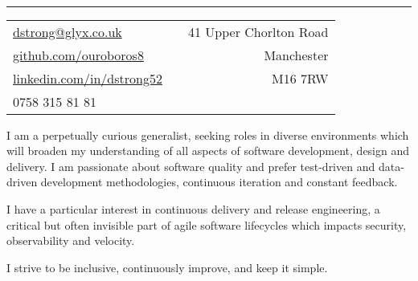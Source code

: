 \documentclass[a4paper,10pt]{article} %
\begin{document}
\pagestyle{empty} %


\\ %
\hrule
\footnotesize
{\begin{tabularx}{\textwidth}{lXr}
\href{mailto:dstrong@glyx.co.uk}{dstrong@glyx.co.uk}                    & & {41 Upper Chorlton Road}\\
\href{https://github.com/ouroboros8}{github.com/ouroboros8}             & & {Manchester}\\
\href{https://www.linkedin.com/in/dstrong52}{linkedin.com/in/dstrong52} & & {M16 7RW} \\
{0758 315 81 81}                                                        & &
\end{tabularx}}

\begin{flushleft}
I am a perpetually curious generalist, seeking roles in diverse environments
which will broaden my understanding of all aspects of software development,
design and delivery. I am passionate about software quality and prefer
test-driven and data-driven development methodologies, continuous iteration and
constant feedback.

I have a particular interest in continuous delivery and release engineering, a
critical but often invisible part of agile software lifecycles which impacts
security, observability and velocity.

I strive to be inclusive, continuously improve, and keep it simple.
\end{flushleft}

\end{document}
